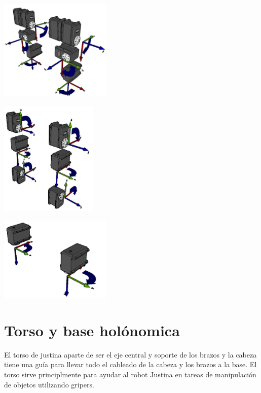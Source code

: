 \documentclass[user_manual.tex]{subfiles}
\begin{document}
\begin{center}
\includegraphics[width=0.4\textwidth]{Figures/Hardware/Cinematica/Cine_7.png}
\end{center}

\begin{center}
\includegraphics[width=0.35\textwidth]{Figures/Hardware/Cinematica/Cine_8.png}
\end{center}

\begin{center}
\includegraphics[width=0.4\textwidth]{Figures/Hardware/Cinematica/Cine_9.png}
\end{center}

\section{Torso y base holónomica}
El torso de justina aparte de ser el eje central y soporte de los brazos y la cabeza tiene una guía para llevar todo el cableado de la cabeza y los brazos a la base. El torso sirve principlmente para ayudar al robot Justina en tareas de manipulación de objetos utilizando gripers.\\
\end{document}
